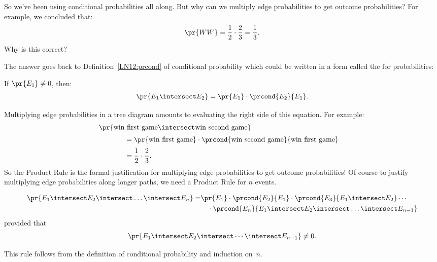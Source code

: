 So we've been using conditional probabilities all along.  But why can
we multiply edge probabilities to get outcome probabilities?  For
example, we concluded that:
%
\begin{equation*}
\pr{WW} = \frac{1}{2} \cdot \frac{2}{3}
	= \frac{1}{3}.
\end{equation*}
%
Why is this correct?

The answer goes back to Definition~\ref{LN12:prcond} of conditional probability
which could be written in a form called the  for
probabilities:
%
\begin{rul*}
If $\pr{E_1} \neq 0$, then:
%
\[
    \pr{E_1 \intersect E_2} = \pr{E_1} \cdot \prcond{E_2}{E_1}.
\]
\end{rul*}
%
Multiplying edge probabilities in a tree diagram amounts to evaluating
the right side of this equation.  For example:
%
\begin{align*}
\lefteqn{\pr{\text{win first game} \intersect \text{win second game}}}
		\hspace{0.5in} \\[2pt]
	& = \pr{\text{win first game}} \cdot
            \prcond{\text{win second game}}{\text{win first game}} \\[2pt]
	& = \frac{1}{2} \cdot \frac{2}{3}.
\end{align*}
%
So the Product Rule is the formal justification for multiplying edge
probabilities to get outcome probabilities!  Of course to justify
multiplying edge probabilities along longer paths, we need a Product Rule
for $n$ events.

\begin{rul*}
\begin{align*}
\pr{E_1 \intersect E_2 \intersect \dots \intersect E_n}
   =& \pr{E_1}
        \cdot \prcond{E_2}{E_1}
        \cdot \prcond{E_3}{E_1 \intersect E_2}
        \cdots \\
    &\quad\cdot
        \prcond{E_n}{E_1 \intersect E_2 \intersect \dots
          \intersect E_{n - 1}}
\end{align*}
provided that
\begin{equation*}
    \pr{E_1 \intersect E_2 \intersect \cdots \intersect E_{n - 1}}
    \neq 0.
\end{equation*}
\end{rul*}
This rule follows from the definition of conditional probability and
induction on~$n$.



